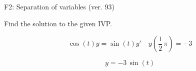 \begin{exercise}
  \begin{exerciseTitle}F2: Separation of variables (ver. 93)\end{exerciseTitle}
  \begin{exerciseStatement}
    
Find the solution to the given IVP.

    
\[\cos\left(t\right) y= \sin\left(t\right) y'\hspace{1em} y\left( \frac{1}{2} \, \pi \right)= -3\]

  \end{exerciseStatement}
  \begin{exerciseAnswer}
    
\[y= -3 \, \sin\left(t\right)\]

  \end{exerciseAnswer}
\end{exercise}